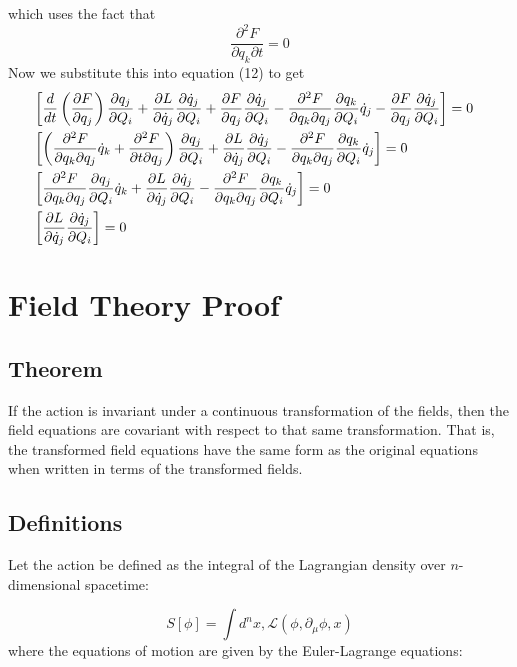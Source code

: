 \documentclass{article}
\begin{document}
which uses the fact that
\[
	\frac{\partial^2 F}{\partial q_k \partial t} = 0
\]
Now we substitute this into equation (12) to get
\begin{align}
	&\left[ \frac{d}{dt} \left( \frac{\partial F}{\partial q_j} \right) \frac{\partial q_j}{\partial Q_i} + \frac{\partial L}{\partial \dot{q}_j} \frac{\partial \dot{q}_j}{\partial Q_i} + \frac{\partial F}{\partial q_j} \frac{\partial \dot{q}_j}{\partial Q_i} - \frac{\partial^2 F}{\partial q_k \partial q_j} \frac{\partial q_k}{\partial Q_i} \dot{q}_j - \frac{\partial F}{\partial q_j} \frac{\partial \dot{q}_j}{\partial Q_i} \right] = 0 \cr
	&\left[ \left(\frac{\partial^2 F}{\partial q_k \partial q_j}\dot q_k + \frac{\partial^2 F}{\partial t \partial q_j}\right) \frac{\partial q_j}{\partial Q_i} + \frac{\partial L}{\partial \dot{q}_j} \frac{\partial \dot{q}_j}{\partial Q_i} - \frac{\partial^2 F}{\partial q_k \partial q_j} \frac{\partial q_k}{\partial Q_i} \dot{q}_j \right] = 0 \cr
	&\left[ \frac{\partial^2 F}{\partial q_k \partial q_j} \frac{\partial q_j}{\partial Q_i}\dot q_k + \frac{\partial L}{\partial \dot{q}_j} \frac{\partial \dot{q}_j}{\partial Q_i} - \frac{\partial^2 F}{\partial q_k \partial q_j} \frac{\partial q_k}{\partial Q_i} \dot{q}_j \right] = 0 \cr
	&\left[ \frac{\partial L}{\partial \dot{q}_j} \frac{\partial \dot{q}_j}{\partial Q_i} \right] = 0
\end{align}

\section{Field Theory Proof}

\subsection{Theorem}
If the action is invariant under a continuous transformation of the fields, then the field equations are covariant with respect to that same transformation. That is, the transformed field equations have the same form as the original equations when written in terms of the transformed fields.

\subsection{Definitions}
Let the action be defined as the integral of the Lagrangian density over $n$-dimensional spacetime:

\begin{equation}
S[\phi] = \int d^nx , \mathcal{L}\left(\phi, \partial_\mu \phi, x\right)
\end{equation}
where the equations of motion are given by the Euler-Lagrange equations:
\end{document}
